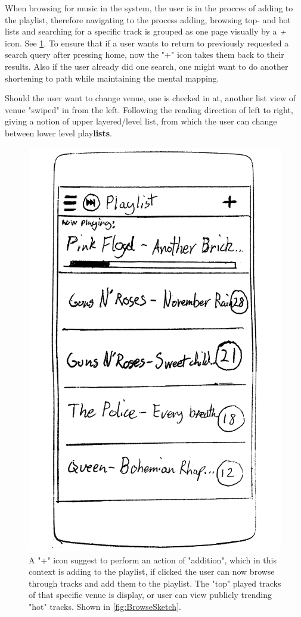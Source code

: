 When browsing for music in the system, the user is in the procces of
adding to the playlist, therefore navigating to the process adding,
browsing top- and hot lists and searching for a specific track is
grouped as one page visually by a \emph{+} icon. See
\cref{fig:PlaylistSketch}. To ensure that if a user wants to return to
previously requested a search query after pressing home, now the "+"
icon takes them back to their results. Also if the user already did
one search, one might want to do another shortening to path while
maintaining the mental mapping. 

Should the user want to change venue, one is checked in at, another list view of venue "swiped" in from the left. Following the reading direction of left to right, giving a notion of upper layered/level  list, from which the user can change between lower level play\textbf{lists}.


\begin{figure}
  \centering
  \includegraphics[width=0.5\linewidth]{Images/sketch3.png}
  \caption{A "+" icon suggest to perform an action of "addition", which in this context is adding to the playlist, if clicked the user can now browse through tracks and add them to the playlist. The "top" played tracks of that specific venue is display, or user can view publicly trending "hot" tracks. Shown in \cref{fig:BrowseSketch}.}
  \label{fig:PlaylistSketch}
\end{figure}

